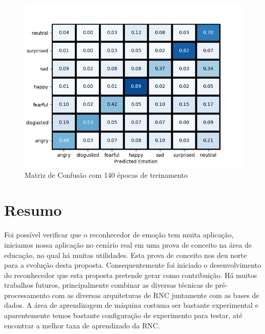 \begin{figure}
\centering
\includegraphics[scale=0.8]{figuras/confusion-matrix-75split-140epo.png}
\caption{Matriz de Confusão com 140 épocas de treinamento}
\label{fig:confusionmatrix}
\end{figure}

\section{Resumo}\label{sec:considera}
Foi possível verificar que o reconhecedor de emoção tem muita aplicação, iniciamos nossa aplicação no cenário real em uma prova de conceito na área de educação, no qual há muitas utilidades. Esta prova de conceito nos deu norte para a evolução desta proposta. Consequentemente foi iniciado o desenvolvimento do reconhecedor que esta proposta pretende gerar como contribuição. Há muitos trabalhos futuros, principalmente combinar as diversas técnicas de pré-processamento com as diversas arquiteturas de RNC juntamente com as bases de dados. A área de aprendizagem de máquina costuma ser bastante experimental e aparentemente temos bastante configuração de experimento para testar, até encontrar a melhor taxa de aprendizado da RNC.


